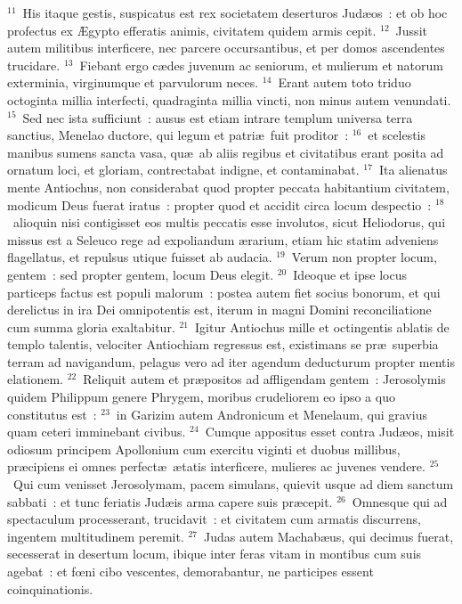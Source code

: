 ${}^{11}$~His itaque gestis, suspicatus est rex societatem deserturos Jud\ae os~: et ob hoc profectus ex \AE gypto efferatis animis, civitatem quidem armis cepit.
${}^{12}$~Jussit autem militibus interficere, nec parcere occursantibus, et per domos ascendentes trucidare.
${}^{13}$~Fiebant ergo c\ae des juvenum ac seniorum, et mulierum et natorum exterminia, virginumque et parvulorum neces.
${}^{14}$~Erant autem toto triduo octoginta millia interfecti, quadraginta millia vincti, non minus autem venundati.
${}^{15}$~Sed nec ista sufficiunt~: ausus est etiam intrare templum universa terra sanctius, Menelao ductore, qui legum et patri\ae\ fuit proditor~:
${}^{16}$~et scelestis manibus sumens sancta vasa, qu\ae\ ab aliis regibus et civitatibus erant posita ad ornatum loci, et gloriam, contrectabat indigne, et contaminabat.
${}^{17}$~Ita alienatus mente Antiochus, non considerabat quod propter peccata habitantium civitatem, modicum Deus fuerat iratus~: propter quod et accidit circa locum despectio~:
${}^{18}$~alioquin nisi contigisset eos multis peccatis esse involutos, sicut Heliodorus, qui missus est a Seleuco rege ad expoliandum \ae rarium, etiam hic statim adveniens flagellatus, et repulsus utique fuisset ab audacia.
${}^{19}$~Verum non propter locum, gentem~: sed propter gentem, locum Deus elegit.
${}^{20}$~Ideoque et ipse locus particeps factus est populi malorum~: postea autem fiet socius bonorum, et qui derelictus in ira Dei omnipotentis est, iterum in magni Domini reconciliatione cum summa gloria exaltabitur.
${}^{21}$~Igitur Antiochus mille et octingentis ablatis de templo talentis, velociter Antiochiam regressus est, existimans se pr\ae\ superbia terram ad navigandum, pelagus vero ad iter agendum deducturum propter mentis elationem.
${}^{22}$~Reliquit autem et pr\ae positos ad affligendam gentem~: Jerosolymis quidem Philippum genere Phrygem, moribus crudeliorem eo ipso a quo constitutus est~:
${}^{23}$~in Garizim autem Andronicum et Menelaum, qui gravius quam ceteri imminebant civibus.
${}^{24}$~Cumque appositus esset contra Jud\ae os, misit odiosum principem Apollonium cum exercitu viginti et duobus millibus, pr\ae cipiens ei omnes perfect\ae\ \ae tatis interficere, mulieres ac juvenes vendere.
${}^{25}$~Qui cum venisset Jerosolymam, pacem simulans, quievit usque ad diem sanctum sabbati~: et tunc feriatis Jud\ae is arma capere suis pr\ae cepit.
${}^{26}$~Omnesque qui ad spectaculum processerant, trucidavit~: et civitatem cum armatis discurrens, ingentem multitudinem peremit.
${}^{27}$~Judas autem Machab\ae us, qui decimus fuerat, secesserat in desertum locum, ibique inter feras vitam in montibus cum suis agebat~: et fœni cibo vescentes, demorabantur, ne participes essent coinquinationis.
